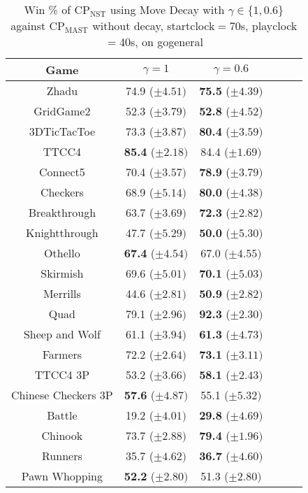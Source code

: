 \documentclass[journal]{IEEEtran}
\begin{document}
\begin{table}[h!]
\caption{Win \% of CP$_{\textrm{NST}}$ using Move Decay with $\gamma \in \{1,0.6\}$ against CP$_{\textrm{MAST}}$ without decay, startclock$=$70s, playclock$=$40s, on gogeneral}
\label{table:exp2b}
\centering
\begin{tabular}{|c|c|c|c|c|c|}
\hline
 \textbf{Game} & $ \gamma = 1$ & $ \gamma = 0.6$\\
\hline\hline
Zhadu & 74.9 ($\pm 4.51)$ & \textbf{75.5} ($\pm 4.39)$ \\ 
GridGame2 & 52.3 ($\pm 3.79)$ & \textbf{52.8}  ($\pm 4.52$)   \\ 
3DTicTacToe & 73.3 ($\pm 3.87)$ & \textbf{80.4} ($\pm 3.59)$   \\ 
TTCC4 & \textbf{85.4} ($\pm 2.18)$ & 84.4 ($\pm 1.69)$ \\ 
Connect5 & 70.4 ($\pm 3.57)$ & \textbf{78.9} ($\pm 3.79)$  \\ 
Checkers &  68.9 ($\pm 5.14)$ & \textbf{80.0} ($\pm 4.38)$   \\ 
Breakthrough & 63.7 ($\pm 3.69)$ & \textbf{72.3}  ($\pm 2.82)$   \\ 
Knightthrough & 47.7 ($\pm 5.29)$ & \textbf{50.0} ($\pm 5.30)$   \\ 
Othello & \textbf{67.4} ($\pm 4.54)$ & 67.0 ($\pm 4.55)$   \\ 
Skirmish & 69.6  ($\pm 5.01)$ & \textbf{70.1}  ($\pm 5.03 )$  \\ 
Merrills & 44.6 ($\pm 2.81)$ & \textbf{50.9}  ($\pm 2.82)$  \\ 
Quad & 79.1 ($\pm 2.96 )$ & \textbf{92.3} ($\pm 2.30)$   \\ 
Sheep and Wolf & 61.1 ($\pm 3.94)$ & \textbf{61.3} ($\pm 4.73)$   \\ 
\hline
Farmers & 72.2 ($\pm 2.64)$ & \textbf{73.1}  ($\pm 3.11)$  \\ 
TTCC4 3P & 53.2 ($\pm 3.66)$ & \textbf{58.1} ($\pm 2.43)$  \\ 
Chinese Checkers 3P & \textbf{57.6} ($\pm 4.87)$ & 55.1  ($\pm 5.32 )$  \\ 
\hline
Battle & 19.2  ($\pm 4.01)$ &  \textbf{29.8} ($\pm 4.69)$  \\ 
Chinook & 73.7 ($\pm 2.88)$ & \textbf{79.4} ($\pm 1.96 )$  \\ 
Runners & 35.7  ($\pm 4.62)$ &  \textbf{36.7} ($\pm 4.60)$  \\ 
Pawn Whopping & \textbf{52.2} ($\pm 2.80 )$ & 51.3 ($\pm 2.80)$  \\ \hline
\end{tabular}
\end{table}
\end{document}
